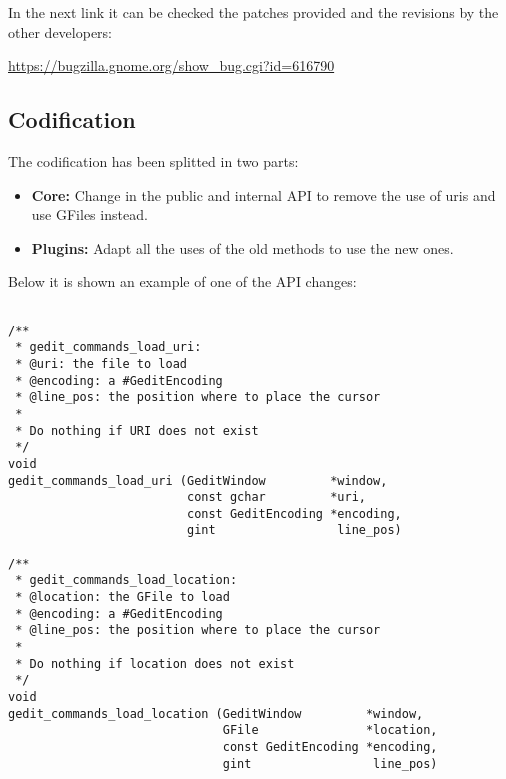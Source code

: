 In the next link it can be checked the patches provided and the revisions by the other developers:

\noindent\url{https://bugzilla.gnome.org/show_bug.cgi?id=616790}

\subsection{Codification}

The codification has been splitted in two parts:
\begin{itemize}
  \item \textbf{Core:} Change in the public and internal API to remove the use of uris and use GFiles instead.
  \item \textbf{Plugins:} Adapt all the uses of the old methods to use the new ones.
\end{itemize}

Below it is shown an example of one of the API changes:

    \begin{lstlisting}[style=GObject]

/**
 * gedit_commands_load_uri:
 * @uri: the file to load
 * @encoding: a #GeditEncoding
 * @line_pos: the position where to place the cursor
 *
 * Do nothing if URI does not exist
 */
void
gedit_commands_load_uri (GeditWindow         *window,
                         const gchar         *uri,
                         const GeditEncoding *encoding,
                         gint                 line_pos)

/**
 * gedit_commands_load_location:
 * @location: the GFile to load
 * @encoding: a #GeditEncoding
 * @line_pos: the position where to place the cursor
 *
 * Do nothing if location does not exist
 */
void
gedit_commands_load_location (GeditWindow         *window,
                              GFile               *location,
                              const GeditEncoding *encoding,
                              gint                 line_pos)

    \end{lstlisting}

